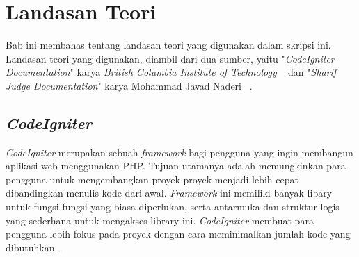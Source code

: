 \chapter{Landasan Teori}
\label{chap:teori}

Bab ini membahas tentang landasan teori yang digunakan dalam skripsi ini. Landasan teori yang digunakan, diambil dari dua sumber, yaitu "\textit{CodeIgniter Documentation}" karya \textit{British Columbia Institute of Technology} ~\cite{bcit:17:cidoc} dan "\textit{Sharif Judge Documentation}" karya Mohammad Javad Naderi ~\cite{mjnaderi:14:sharifjudgedoc}.

\section{\textit{CodeIgniter}}
\label{sec:codeigniter} 
 
\textit{CodeIgniter} merupakan sebuah \textit{framework} bagi pengguna yang ingin membangun aplikasi web menggunakan PHP. Tujuan utamanya adalah memungkinkan para pengguna untuk mengembangkan proyek-proyek menjadi lebih cepat dibandingkan menulis kode dari awal. \textit{Framework} ini memiliki banyak libary untuk fungsi-fungsi yang biasa diperlukan, serta antarmuka dan struktur logis yang sederhana untuk mengakses library ini. \textit{CodeIgniter} membuat para pengguna lebih fokus pada proyek dengan cara meminimalkan jumlah kode yang dibutuhkan~\cite{bcit:17:cidoc}. \\

